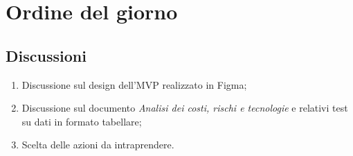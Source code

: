 \section{Ordine del giorno} \label{sec:agenda}
\subsection{Discussioni} \label{subsec:discussione}
\begin{enumerate}

    \item Discussione sul design dell'MVP realizzato in Figma;
    \item Discussione sul documento \textit{Analisi dei costi, rischi e tecnologie} e relativi test su dati in formato tabellare;
    \item Scelta delle azioni da intraprendere.
\end{enumerate}

